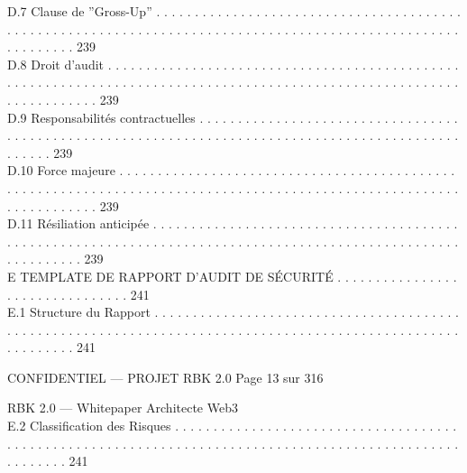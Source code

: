 D.7     Clause de ”Gross-Up” . . . . . . . . . . . . . . . . . . . . . . . . . . . . . . . . . . . . . . . . . . . . . . . . . . . . . . . . . . . . . . . . . . . . . . . . . . . . . . . . . . . . . . . . . . . . . . . . . . . . . . . . . . . . 239\\
D.8     Droit d’audit . . . . . . . . . . . . . . . . . . . . . . . . . . . . . . . . . . . . . . . . . . . . . . . . . . . . . . . . . . . . . . . . . . . . . . . . . . . . . . . . . . . . . . . . . . . . . . . . . . . . . . . . . . . . . . . . . . . . . 239\\
D.9     Responsabilités contractuelles . . . . . . . . . . . . . . . . . . . . . . . . . . . . . . . . . . . . . . . . . . . . . . . . . . . . . . . . . . . . . . . . . . . . . . . . . . . . . . . . . . . . . . . . . . . . . . . . . . . 239\\
D.10    Force majeure . . . . . . . . . . . . . . . . . . . . . . . . . . . . . . . . . . . . . . . . . . . . . . . . . . . . . . . . . . . . . . . . . . . . . . . . . . . . . . . . . . . . . . . . . . . . . . . . . . . . . . . . . . . . . . . . . . . 239\\
D.11    Résiliation anticipée . . . . . . . . . . . . . . . . . . . . . . . . . . . . . . . . . . . . . . . . . . . . . . . . . . . . . . . . . . . . . . . . . . . . . . . . . . . . . . . . . . . . . . . . . . . . . . . . . . . . . . . . . . . . . 239\\
\vspace{0.5em}
E     TEMPLATE DE RAPPORT D’AUDIT DE SÉCURITÉ . . . . . . . . . . . . . . . . . . . . . . . . . . . . . . . . 241\\
E.1     Structure du Rapport . . . . . . . . . . . . . . . . . . . . . . . . . . . . . . . . . . . . . . . . . . . . . . . . . . . . . . . . . . . . . . . . . . . . . . . . . . . . . . . . . . . . . . . . . . . . . . . . . . . . . . . . . . . . 241\\
\vspace{0.5em}
\vspace{0.5em}
\vspace{0.5em}
\begin{confidential}CONFIDENTIEL — PROJET RBK 2.0                                                                                Page 13 sur 316\end{confidential}
RBK 2.0 — Whitepaper Architecte Web3\\
\vspace{0.5em}
\vspace{0.5em}
E.2     Classification des Risques . . . . . . . . . . . . . . . . . . . . . . . . . . . . . . . . . . . . . . . . . . . . . . . . . . . . . . . . . . . . . . . . . . . . . . . . . . . . . . . . . . . . . . . . . . . . . . . . . . . . . . . . 241\\
